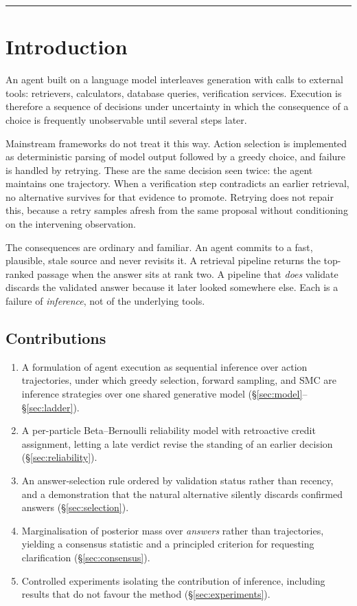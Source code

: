 \documentclass[11pt,a4paper]{article}
\begin{document}
\vspace{0.5em}
\hrule
\vspace{1em}

\section{Introduction}

An agent built on a language model interleaves generation with calls to
external tools: retrievers, calculators, database queries, verification
services. Execution is therefore a sequence of decisions under uncertainty in
which the consequence of a choice is frequently unobservable until several
steps later.

Mainstream frameworks do not treat it this way. Action selection is implemented
as deterministic parsing of model output followed by a greedy choice, and
failure is handled by retrying. These are the same decision seen twice: the
agent maintains one trajectory. When a verification step contradicts an earlier
retrieval, no alternative survives for that evidence to promote. Retrying does
not repair this, because a retry samples afresh from the same proposal without
conditioning on the intervening observation.

The consequences are ordinary and familiar. An agent commits to a fast,
plausible, stale source and never revisits it. A retrieval pipeline returns the
top-ranked passage when the answer sits at rank two. A pipeline that
\emph{does} validate discards the validated answer because it later looked
somewhere else. Each is a failure of \emph{inference}, not of the underlying
tools.

\subsection{Contributions}

\begin{enumerate}[leftmargin=1.4em,itemsep=0.25em]
\item A formulation of agent execution as sequential inference over action
      trajectories, under which greedy selection, forward sampling, and SMC
      are inference strategies over one shared generative model
      (\S\ref{sec:model}--\S\ref{sec:ladder}).
\item A per-particle Beta--Bernoulli reliability model with retroactive credit
      assignment, letting a late verdict revise the standing of an earlier
      decision (\S\ref{sec:reliability}).
\item An answer-selection rule ordered by validation status rather than
      recency, and a demonstration that the natural alternative silently
      discards confirmed answers (\S\ref{sec:selection}).
\item Marginalisation of posterior mass over \emph{answers} rather than
      trajectories, yielding a consensus statistic and a principled criterion
      for requesting clarification (\S\ref{sec:consensus}).
\item Controlled experiments isolating the contribution of inference, including
      results that do not favour the method (\S\ref{sec:experiments}).
\end{enumerate}
\end{document}
